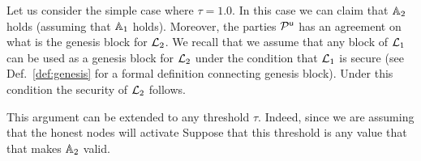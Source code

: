 Let us consider the simple case where $\tau=1.0$. In this case we can claim that $\mathbb{A}_2$ holds (assuming that $\mathbb{A}_1$ holds).
Moreover, the parties $\mathcal{P}^\mathsf{u}$ has an agreement on what is the genesis block for $\mathcal{L}_2$. We recall that we assume that any block of $\mathcal{L}_1$ can be used as
a genesis block for $\mathcal{L}_2$ under the condition that $\mathcal{L}_1$ is secure (see Def.~\ref{def:genesis} for a formal definition connecting genesis block).
Under this condition the security of $\mathcal{L}_2$  follows. 

 
This argument can be extended to any threshold $\tau$. Indeed, since we are assuming that the honest nodes will activate
Suppose that this threshold is any value that that makes $\mathbb{A}_2$ valid.
